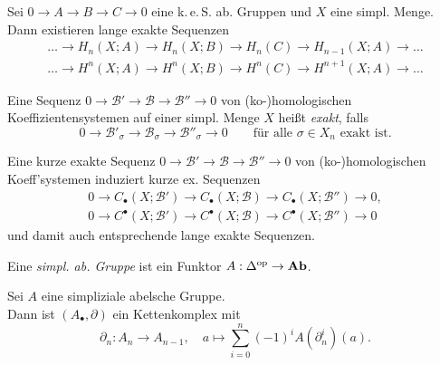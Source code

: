 \documentclass{cheat-sheet}
\newcommand{\CC}[1]{{#1}_{\bullet}} %
\newcommand{\CCC}[1]{{#1}^{\bullet}} %
\newcommand{\keS}{k.\,e.\,S.} %
\begin{document}
\begin{kor}
  Sei $0 \to A \to B \to C \to 0$ eine \keS{} ab. Gruppen und $X$ eine simpl. Menge. Dann existieren lange exakte Sequenzen
  \begin{align*}
    \ldots \to H_n(X; A) \to H_n(X; B) \to H_n(C) \to H_{n-1}(X; A) \to \ldots \\
    \ldots \to H^n(X; A) \to H^n(X; B) \to H^n(C) \to H^{n+1}(X; A) \to \ldots
  \end{align*}
\end{kor}



\begin{defn}
  Eine Sequenz $0 \to \mathcal{B}' \to \mathcal{B} \to \mathcal{B}'' \to 0$ von (ko-)homologischen Koeffizientensystemen auf einer simpl. Menge $X$ heißt \emph{exakt}, falls
  \[
    0 \to \mathcal{B}'_\sigma \to \mathcal{B}_\sigma \to \mathcal{B}''_\sigma \to 0 \qquad
    \text{für alle $\sigma \in X_n$ exakt ist.}
  \]
\end{defn}

\begin{lem}
  Eine kurze exakte Sequenz $0 \to \mathcal{B}' \to \mathcal{B} \to \mathcal{B}'' \to 0$ von (ko-)homologischen Koeff'systemen induziert kurze ex. Sequenzen
  \begin{align*}
    0 \to \CC{C}(X; \mathcal{B}') \to \CC{C}(X; \mathcal{B}) \to \CC{C}(X; \mathcal{B}'') \to 0, \\
    0 \to \CCC{C}(X; \mathcal{B}') \to \CCC{C}(X; \mathcal{B}) \to \CCC{C}(X; \mathcal{B}'') \to 0
  \end{align*}
  und damit auch entsprechende lange exakte Sequenzen.
\end{lem}



\begin{defn}
  Eine \emph{simpl. ab. Gruppe} ist ein Funktor
  $A : \Delta^{\mathrm{op}} \to \mathbf{Ab}$.
\end{defn}

\begin{defn}
  Sei $A$ eine simpliziale abelsche Gruppe. \\
  Dann ist $(A_\bullet, \partial)$ ein Kettenkomplex mit
  \[
    \partial_n : A_n \to A_{n-1}, \quad
    a \mapsto \sum_{i=0}^n (-1)^i A(\partial_n^i)(a).
  \]
\end{defn}
\end{document}
